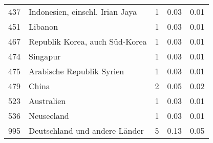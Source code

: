 \begin{longtable}{lXrrr}
        437 & \multicolumn{1}{X}{Indonesien, einschl. Irian Jaya} & %
          \num{1} &
          \num[round-mode=places,round-precision=2]{0,03} &
          \num[round-mode=places,round-precision=2]{0,01} \\

        451 & \multicolumn{1}{X}{Libanon} & %
          \num{1} &
          \num[round-mode=places,round-precision=2]{0,03} &
          \num[round-mode=places,round-precision=2]{0,01} \\

        467 & \multicolumn{1}{X}{Republik Korea, auch Süd-Korea} & %
          \num{1} &
          \num[round-mode=places,round-precision=2]{0,03} &
          \num[round-mode=places,round-precision=2]{0,01} \\

        474 & \multicolumn{1}{X}{Singapur} & %
          \num{1} &
          \num[round-mode=places,round-precision=2]{0,03} &
          \num[round-mode=places,round-precision=2]{0,01} \\

        475 & \multicolumn{1}{X}{Arabische Republik Syrien} & %
          \num{1} &
          \num[round-mode=places,round-precision=2]{0,03} &
          \num[round-mode=places,round-precision=2]{0,01} \\

        479 & \multicolumn{1}{X}{China} & %
          \num{2} &
          \num[round-mode=places,round-precision=2]{0,05} &
          \num[round-mode=places,round-precision=2]{0,02} \\

        523 & \multicolumn{1}{X}{Australien} & %
          \num{1} &
          \num[round-mode=places,round-precision=2]{0,03} &
          \num[round-mode=places,round-precision=2]{0,01} \\

        536 & \multicolumn{1}{X}{Neuseeland} & %
          \num{1} &
          \num[round-mode=places,round-precision=2]{0,03} &
          \num[round-mode=places,round-precision=2]{0,01} \\

        995 & \multicolumn{1}{X}{Deutschland und andere Länder} & %
          \num{5} &
          \num[round-mode=places,round-precision=2]{0,13} &
          \num[round-mode=places,round-precision=2]{0,05} \\


\end{longtable}

